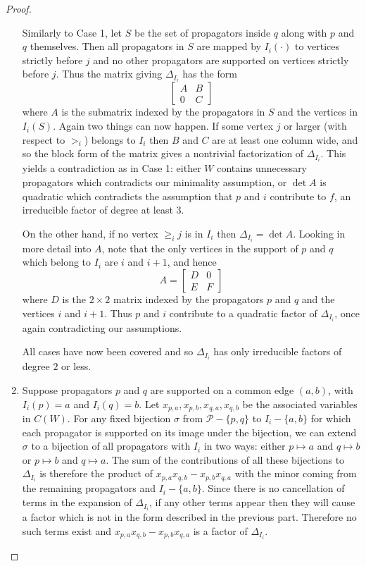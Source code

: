 \documentclass[11pt]{article}
\newcommand{\cP}{\mathcal{P}}
\theoremstyle{remark}
\theoremstyle{definition}
\begin{document}
\begin{proof}
\begin{enumerate}
Similarly to Case 1, let $S$ be the set of propagators inside $q$ along with $p$ and $q$ themselves. Then all propagators in $S$ are mapped by $I_i(\cdot)$ to vertices strictly before $j$ and no other propagators are supported on vertices strictly before $j$.  Thus the matrix giving $\Delta_{I_i}$ has the form
\[
\begin{bmatrix} A & B \\ 0 & C\end{bmatrix}
\]
where $A$ is the submatrix indexed by the propagators in $S$ and the vertices in $I_i(S)$. Again two things can now happen.  If some vertex $j$ or larger (with respect to $>_i$) belongs to $I_i$ then $B$ and $C$ are at least one column wide, and so the block form of the matrix gives a nontrivial factorization of $\Delta_{I_i}$.  This yields a contradiction as in Case 1: either $W$ contains unnecessary propagators which contradicts our minimality assumption, or $\det A$ is quadratic which contradicts the assumption that $p$ and $i$ contribute to $f$, an irreducible factor of degree at least 3.  

On the other hand, if no vertex $\geq_i j$ is in $I_i$ then $\Delta_{I_i} = \det A$.  Looking in more detail into $A$, note that the only vertices in the support of $p$ and $q$ which belong to $I_i$ are $i$ and $i+1$, and hence
\[
A = \begin{bmatrix} D & 0 \\ E & F\end{bmatrix}
\]
where $D$ is the $2\times 2$ matrix indexed by the propagators $p$ and $q$ and the vertices $i$ and $i+1$.  Thus $p$ and $i$ contribute to a quadratic factor of $\Delta_{I_i}$, once again contradicting our assumptions.

All cases have now been covered and so $\Delta_{I_i}$ has only irreducible factors of degree $2$ or less.

\item Suppose propagators $p$ and $q$ are supported on a common edge $(a,b)$, with $I_i(p)=a$ and $I_i(q)=b$.  Let $x_{p,a},x_{p,b},x_{q,a},x_{q,b}$ be the associated variables in $C(W)$. For any fixed bijection $\sigma$ from $\cP-\{p,q\}$ to $I_i -\{a,b\}$ for which each propagator is supported on its image under the bijection, we can extend $\sigma$ to a bijection of all propagators with $I_i$ in two ways: either $p\mapsto a$ and $q\mapsto b$ or $p\mapsto b$ and $q\mapsto a$.  The sum of the contributions of all these bijections to $\Delta_{I_i}$ is therefore the product of $x_{p,a}x_{q,b}-x_{p,b}x_{q,a}$ with the minor coming from the remaining propagators and $I_i - \{a,b\}$.  Since there is no cancellation of terms in the expansion of $\Delta_{I_i}$, if any other terms appear then they will cause a factor which is not in the form described in the previous part.  Therefore no such terms exist and $x_{p,a}x_{q,b}-x_{p,b}x_{q,a}$ is a factor of $\Delta_{I_i}$.


\end{enumerate}
\end{proof}
\end{document}
